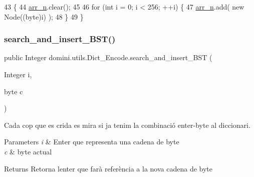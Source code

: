 \begin{DoxyCode}
43                                    \{
44         \hyperlink{classdomini_1_1utils_1_1Dict__Encode_abc506ae01222e16d9b6581efbdad1a97}{arr\_n}.clear();
45 
46         \textcolor{keywordflow}{for} (\textcolor{keywordtype}{int} i = 0; i < 256; ++i) \{
47             \hyperlink{classdomini_1_1utils_1_1Dict__Encode_abc506ae01222e16d9b6581efbdad1a97}{arr\_n}.add( \textcolor{keyword}{new} Node((byte)i) );
48         \}
49     \}
\end{DoxyCode}
\mbox{\label{classdomini_1_1utils_1_1Dict__Encode_a1bafdca1835da3fa93b900ff0aa720e0}} 
\subsubsection{\texorpdfstring{search\+\_\+and\+\_\+insert\+\_\+\+B\+S\+T()}{search\_and\_insert\_BST()}}
{\footnotesize\ttfamily public Integer domini.\+utils.\+Dict\+\_\+\+Encode.\+search\+\_\+and\+\_\+insert\+\_\+\+B\+ST (\begin{DoxyParamCaption}\item[{Integer}]{i,  }\item[{byte}]{c }\end{DoxyParamCaption})\hspace{0.3cm}{\ttfamily [inline]}}



Cada cop que es crida es mira si ja tenim la combinació enter-\/byte al diccionari. 


\begin{DoxyParams}{Parameters}
{\em i} & Enter que representa una cadena de byte \\
\hline
{\em c} & byte actual \\
\hline
\end{DoxyParams}
\begin{DoxyReturn}{Returns}
Retorna l\textquotesingle{}enter que farà referència a la nova cadena de byte 
\end{DoxyReturn}

